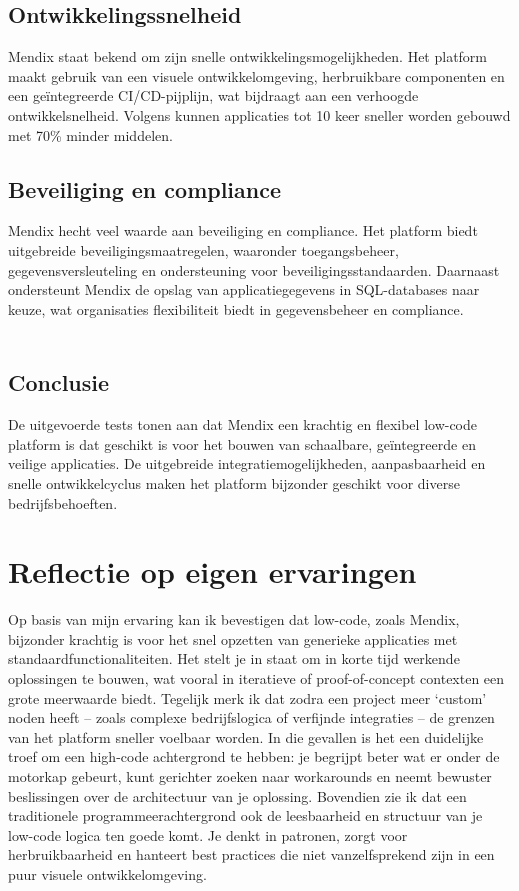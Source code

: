 \subsection{Ontwikkelingssnelheid}
Mendix staat bekend om zijn snelle ontwikkelingsmogelijkheden. Het platform maakt gebruik van een visuele ontwikkelomgeving, herbruikbare componenten en een geïntegreerde CI/CD-pijplijn, wat bijdraagt aan een verhoogde ontwikkelsnelheid. Volgens \textcite{MxTechies} kunnen applicaties tot 10 keer sneller worden gebouwd met 70\% minder middelen. 

\subsection{Beveiliging en compliance}
Mendix hecht veel waarde aan beveiliging en compliance. Het platform biedt uitgebreide beveiligingsmaatregelen, waaronder toegangsbeheer, gegevensversleuteling en ondersteuning voor beveiligingsstandaarden. Daarnaast ondersteunt Mendix de opslag van applicatiegegevens in SQL-databases naar keuze, wat organisaties flexibiliteit biedt in gegevensbeheer en compliance. 
\\
\\
\subsection{Conclusie}
De uitgevoerde tests tonen aan dat Mendix een krachtig en flexibel low-code platform is dat geschikt is voor het bouwen van schaalbare, geïntegreerde en veilige applicaties. De uitgebreide integratiemogelijkheden, aanpasbaarheid en snelle ontwikkelcyclus maken het platform bijzonder geschikt voor diverse bedrijfsbehoeften.


\section{Reflectie op eigen ervaringen}
Op basis van mijn ervaring kan ik bevestigen dat low-code, zoals Mendix, bijzonder krachtig is voor het snel opzetten van generieke applicaties met standaardfunctionaliteiten. Het stelt je in staat om in korte tijd werkende oplossingen te bouwen, wat vooral in iteratieve of proof-of-concept contexten een grote meerwaarde biedt. Tegelijk merk ik dat zodra een project meer ‘custom’ noden heeft – zoals complexe bedrijfslogica of verfijnde integraties – de grenzen van het platform sneller voelbaar worden. In die gevallen is het een duidelijke troef om een high-code achtergrond te hebben: je begrijpt beter wat er onder de motorkap gebeurt, kunt gerichter zoeken naar workarounds en neemt bewuster beslissingen over de architectuur van je oplossing. Bovendien zie ik dat een traditionele programmeerachtergrond ook de leesbaarheid en structuur van je low-code logica ten goede komt. Je denkt in patronen, zorgt voor herbruikbaarheid en hanteert best practices die niet vanzelfsprekend zijn in een puur visuele ontwikkelomgeving.

